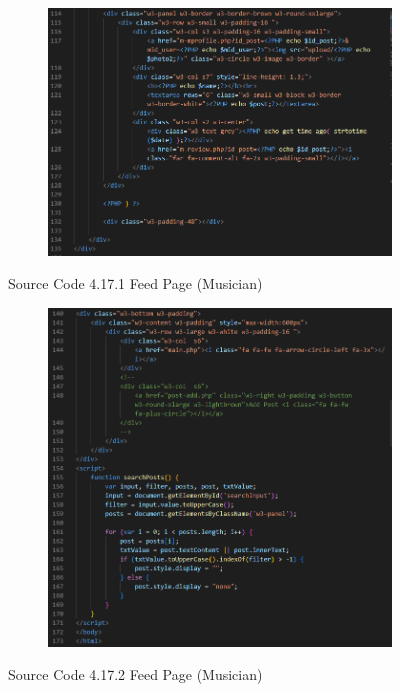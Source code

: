 \begin{enumerate}[1.]
\begin{figure}[h]
\begin{subfigure}[b]{0.7\textwidth}
            \includegraphics[width=\textwidth]{mainmatter/images/frontend/code/musicfeed2.png}
            \label{fig:sub2}
        \end{subfigure}
        \caption*{Source Code 4.17.1 Feed Page (Musician)}
        \label{fig:myfig56a}
    \end{figure}
    \begin{figure}[h]\ContinuedFloat
        \centering
        \begin{subfigure}[b]{0.7\textwidth}
            \centering
            \includegraphics[width=\textwidth]{mainmatter/images/frontend/code/musicfeed3.png}
            \label{fig:sub3}
        \end{subfigure}
        \caption*{Source Code 4.17.2 Feed Page (Musician)}
        \label{fig:myfig56b}
    \end{figure}


\end{enumerate}
